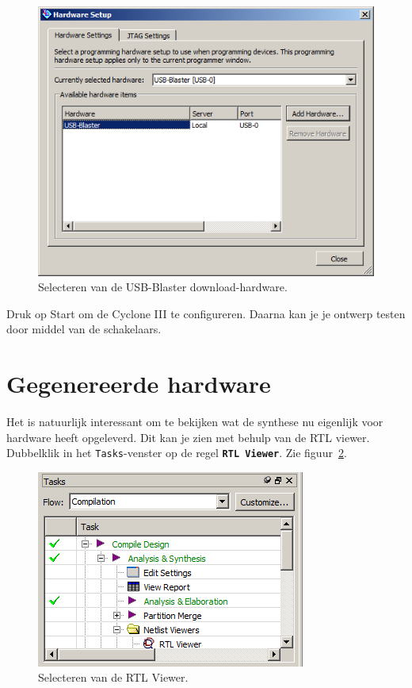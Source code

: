 \documentclass[a4paper,12pt,fleqn,twoside]{book}
\def\tutpicscale{0.455}
\newcommand{\menu}[1]{\texttt{\textbf{#1}}}
\newcommand{\naam}[1]{\texttt{#1}}
\begin{document}
\begin{figure}[H]
\centering
\includegraphics[scale=\tutpicscale]{096addhardware.png}
\caption{Selecteren van de USB-Blaster download-hardware.}
\label{fig:096addhardware}
\end{figure}

Druk op Start om de Cyclone III te configureren. Daarna kan je je ontwerp testen door middel 
van de schakelaars.

\section{Gegenereerde hardware}
\label{sec:gegenereerdehardware}

Het is natuurlijk interessant om te bekijken wat de synthese nu eigenlijk voor hardware heeft 
opgeleverd. Dit kan je zien met behulp van de RTL viewer. Dubbelklik in het \naam{Tasks}-venster op 
de regel \menu{RTL Viewer}. Zie figuur~\ref{fig:100startrtlviewer}.

\begin{figure}[H]
\centering
\includegraphics[scale=\tutpicscale]{100startrtlviewer.png}
\caption{Selecteren van de RTL Viewer.}
\label{fig:100startrtlviewer}
\end{figure}
\end{document}
